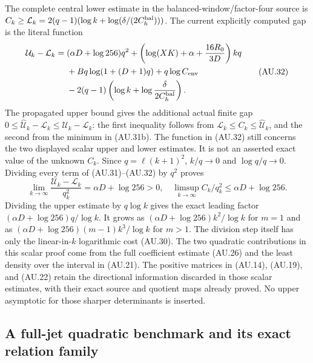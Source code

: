 The complete central lower estimate in the balanced-window/factor-four
source is
$C_k\ge\mathcal L_k=2(q-1)(\log k+\log(\delta/(2C_h^{\rm bal})))$.
The current explicitly computed gap is the literal function
\[
 \begin{split}
 \mathcal U_k-\mathcal L_k
  ={}&(\alpha D+\log256)q^2
   +\left(\log(XK)+\alpha+\frac{16R_0}{3D}\right)kq
   \\
   &+Bq\log(1+(D+1)q)+q\log C_{\rm env}\\
   &-2(q-1)\left(\log k+\log\frac{\delta}{2C_h^{\rm bal}}\right).
 \end{split}
 \tag{AU.32}
\]
The propagated upper bound gives the additional actual finite gap
$0\le\widehat{\mathcal U}_k-\mathcal L_k\le
\mathcal U_k-\mathcal L_k$: the first inequality follows from
$\mathcal L_k\le C_k\le\widehat{\mathcal U}_k$, and the second from
the minimum in (AU.31b). The function in (AU.32) still concerns the
two displayed scalar upper and lower estimates.
It is not an asserted exact value of the unknown $C_k$.
Since $q=\ell(k+1)^2$, $k/q\to0$ and $\log q/q\to0$.
Dividing every term of (AU.31)--(AU.32) by $q^2$ proves
\[
 \lim_{k\to\infty}\frac{\mathcal U_k-\mathcal L_k}{q_k^2}
       =\alpha D+\log256>0,
 \quad
 \limsup_{k\to\infty}C_k/q_k^2\le\alpha D+\log256.
 \tag{AU.33}
\]
Dividing the upper estimate by $q\log k$ gives the exact leading
factor $(\alpha D+\log256)q/\log k$. It grows as
$(\alpha D+\log256)k^2/\log k$ for $m=1$ and as
$(\alpha D+\log256)(m-1)k^3/\log k$ for $m>1$.
The division step itself has only the linear-in-$k$ logarithmic cost
(AU.30). The two quadratic contributions in this scalar proof come
from the full coefficient estimate (AU.26) and the least density over
the interval in (AU.21). The positive matrices in (AU.14), (AU.19),
and (AU.22) retain the directional information discarded in those
scalar estimates, with their exact source and quotient maps already
proved. No upper asymptotic for those sharper determinants is inserted.

\subsection{A full-jet quadratic benchmark and its exact relation family}

